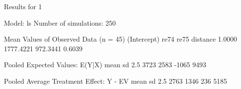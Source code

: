 \begin{enumerate}
\begin{Schunk}
\begin{Soutput}
Results for 1 

  Model: ls 
  Number of simulations: 250 

Mean Values of Observed Data (n = 45) 
(Intercept)        re74        re75    distance 
     1.0000   1777.4221    972.3441      0.6039 

Pooled Expected Values: E(Y|X)
 mean    sd  2.5% 97.5% 
 3723  2583 -1065  9493 

Pooled Average Treatment Effect: Y - EV
 mean    sd  2.5% 97.5% 
 2763  1346   236  5185 


\end{Soutput}
\end{Schunk}
  
\end{enumerate}

